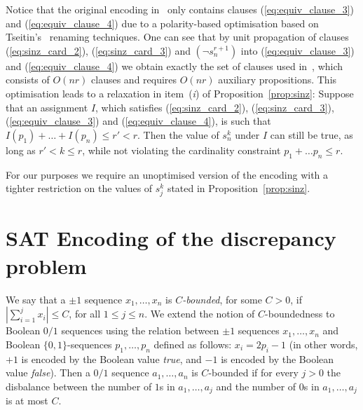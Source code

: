 \documentclass{article} \usepackage[utf8]{inputenc}
\newcommand*{\csf}{\ensuremath{{s}}}
\begin{document}
Notice that the original encoding in~\cite{Sinz05} only contains clauses
(\ref{eq:equiv_clause_3}) and (\ref{eq:equiv_clause_4}) due to a 
polarity-based optimisation based on Tseitin's~ renaming techniques.
One can see that
by unit propagation of clauses (\ref{eq:sinz_card_2}), (\ref{eq:sinz_card_3}) and
$(\lnot \csf^{r+1}_n)$ into (\ref{eq:equiv_clause_3}) and
(\ref{eq:equiv_clause_4}) we obtain exactly the set of clauses used
in~\cite{Sinz05}, which consists of $O(nr)$ clauses and requires $O(nr)$
auxiliary propositions. 
This optimisation leads to a relaxation in
item~(\textit{i}) of Proposition~\ref{prop:sinz}: Suppose that an assignment
$I$, which
satisfies 
(\ref{eq:sinz_card_2}),
(\ref{eq:sinz_card_3}),
(\ref{eq:equiv_clause_3}) and
(\ref{eq:equiv_clause_4}),
is such that $I(p_1)+\dots +I(p_n) \leq r' < r$.  Then the value of
$\csf^k_n$ under $I$ can still be true, as long as $r'<k\leq r$, while not
violating the cardinality constraint $p_1+\dots p_n\leq r$.  

For our purposes we require an unoptimised version of the encoding with 
a tighter restriction on the values of $\csf^k_j$ stated in Proposition~\ref{prop:sinz}.





\section{SAT Encoding of the discrepancy problem}\label{sec:encoding}

We say that a $\pm1$ sequence $x_1,\dots, x_n$ is \emph{$C$-bounded}, for some $C > 0$,
if  $|\sum_{i=1}^{j}x_i| \leq C$, for all $1\leq j \leq n$.
We extend the notion of $C$-boundedness to Boolean $0/1$ sequences using the 
relation between $\pm1$ sequences $x_1,\dots,x_n$ and Boolean
$\{0,1\}$-sequences $p_1,\dots, p_n$ defined as follows: $x_i = 2p_i-1$ (in other
words, $+1$ is encoded by the Boolean value \emph{true}, and $-1$ is encoded by
the Boolean value \emph{false}). Then a $0/1$ sequence 
$a_1,\dots, a_n$ is $C$-bounded if for every $j>0$ 
the disbalance between the number of $1$s in $a_1,\dots, a_j$ and the 
number of $0$s in $a_1,\dots, a_j$ is at most $C$.
\end{document}
